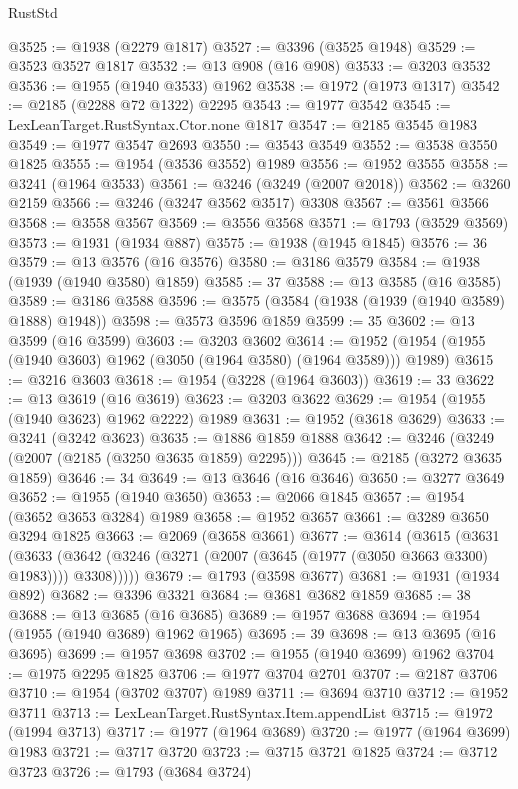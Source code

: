 \begin{lexlean}{RustStd}
\begin{coremodule}
@3525 := @1938 (@2279 @1817)
@3527 := @3396 (@3525 @1948)
@3529 := @3523 @3527 @1817
@3532 := @13 @908 (@16 @908)
@3533 := @3203 @3532
@3536 := @1955 (@1940 @3533) @1962
@3538 := @1972 (@1973 @1317)
@3542 := @2185 (@2288 @72 @1322) @2295
@3543 := @1977 @3542
@3545 := LexLeanTarget.RustSyntax.Ctor.none @1817
@3547 := @2185 @3545 @1983
@3549 := @1977 @3547 @2693
@3550 := @3543 @3549
@3552 := @3538 @3550 @1825
@3555 := @1954 (@3536 @3552) @1989
@3556 := @1952 @3555
@3558 := @3241 (@1964 @3533)
@3561 := @3246 (@3249 (@2007 @2018))
@3562 := @3260 @2159
@3566 := @3246 (@3247 @3562 @3517) @3308
@3567 := @3561 @3566
@3568 := @3558 @3567
@3569 := @3556 @3568
@3571 := @1793 (@3529 @3569)
@3573 := @1931 (@1934 @887)
@3575 := @1938 (@1945 @1845)
@3576 := 36
@3579 := @13 @3576 (@16 @3576)
@3580 := @3186 @3579
@3584 := @1938 (@1939 (@1940 @3580) @1859)
@3585 := 37
@3588 := @13 @3585 (@16 @3585)
@3589 := @3186 @3588
@3596 := @3575 (@3584 (@1938 (@1939 (@1940 @3589) @1888) @1948))
@3598 := @3573 @3596 @1859
@3599 := 35
@3602 := @13 @3599 (@16 @3599)
@3603 := @3203 @3602
@3614 := @1952 (@1954 (@1955 (@1940 @3603) @1962 (@3050 (@1964 @3580) (@1964 @3589))) @1989)
@3615 := @3216 @3603
@3618 := @1954 (@3228 (@1964 @3603))
@3619 := 33
@3622 := @13 @3619 (@16 @3619)
@3623 := @3203 @3622
@3629 := @1954 (@1955 (@1940 @3623) @1962 @2222) @1989
@3631 := @1952 (@3618 @3629)
@3633 := @3241 (@3242 @3623)
@3635 := @1886 @1859 @1888
@3642 := @3246 (@3249 (@2007 (@2185 (@3250 @3635 @1859) @2295)))
@3645 := @2185 (@3272 @3635 @1859)
@3646 := 34
@3649 := @13 @3646 (@16 @3646)
@3650 := @3277 @3649
@3652 := @1955 (@1940 @3650)
@3653 := @2066 @1845
@3657 := @1954 (@3652 @3653 @3284) @1989
@3658 := @1952 @3657
@3661 := @3289 @3650 @3294 @1825
@3663 := @2069 (@3658 @3661)
@3677 := @3614
    (@3615
      (@3631
        (@3633 (@3642 (@3246 (@3271 (@2007 (@3645 (@1977 (@3050 @3663 @3300) @1983)))) @3308)))))
@3679 := @1793 (@3598 @3677)
@3681 := @1931 (@1934 @892)
@3682 := @3396 @3321
@3684 := @3681 @3682 @1859
@3685 := 38
@3688 := @13 @3685 (@16 @3685)
@3689 := @1957 @3688
@3694 := @1954 (@1955 (@1940 @3689) @1962 @1965)
@3695 := 39
@3698 := @13 @3695 (@16 @3695)
@3699 := @1957 @3698
@3702 := @1955 (@1940 @3699) @1962
@3704 := @1975 @2295 @1825
@3706 := @1977 @3704 @2701
@3707 := @2187 @3706
@3710 := @1954 (@3702 @3707) @1989
@3711 := @3694 @3710
@3712 := @1952 @3711
@3713 := LexLeanTarget.RustSyntax.Item.appendList
@3715 := @1972 (@1994 @3713)
@3717 := @1977 (@1964 @3689)
@3720 := @1977 (@1964 @3699) @1983
@3721 := @3717 @3720
@3723 := @3715 @3721 @1825
@3724 := @3712 @3723
@3726 := @1793 (@3684 @3724)

\end{coremodule}
\end{lexlean}
